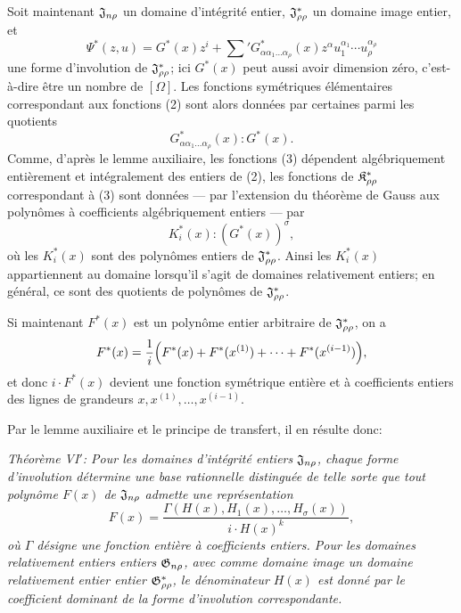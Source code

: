 Soit maintenant $\mathfrak{J}_{n\rho}$ un domaine d’intégrité entier, $\mathfrak{J}^*_{\rho\rho}$ un domaine image entier, et
\[
  \Psi^*(z,u)=G^*(x)z^i+
  \sum{}'G^*_{\alpha\alpha_1\ldots\alpha_\rho}(x)
  z^\alpha u_1^{\alpha_1}\cdots u_\rho^{\alpha_\rho}
\]
une forme d'involution de $\mathfrak{J}^*_{\rho\rho}$; ici $G^*(x)$ peut aussi avoir dimension zéro, c'est-à-dire être un nombre de $[\Omega]$. Les fonctions symétriques élémentaires correspondant aux fonctions (2) sont alors données par certaines parmi les quotients
\begin{equation}
  G^*_{\alpha\alpha_1\ldots\alpha_\rho}(x):G^*(x).
\tag{4}
\end{equation}
Comme, d'après le lemme auxiliaire, les fonctions (3) dépendent algébriquement entièrement et intégralement des entiers de (2), les fonctions de $\mathfrak{K}^*_{\rho\rho}$ correspondant à (3) sont données --- par l'extension du théorème de Gauss aux polynômes à coefficients algébriquement entiers --- par
\begin{equation}
 K_i^*(x):(G^*(x))^\sigma,
\tag{5}
\end{equation}
où les $K_i^*(x)$ sont des polynômes entiers de $\mathfrak{J}^*_{\rho\rho}$. Ainsi les $K_i^*(x)$ appartiennent au domaine lorsqu'il s'agit de domaines relativement entiers; en général, ce sont des quotients de polynômes de $\mathfrak{J}^*_{\rho\rho}$.

Si maintenant $F^*(x)$ est un polynôme entier arbitraire de $\mathfrak{J}^*_{\rho\rho}$, on a
\[
  F^*(x)=\frac1i\Bigl(F^*(x)+F^*(x^{(1)})+\cdots+F^*(x^{(i-1)})\Bigr),
\]
et donc $i\cdot F^*(x)$ devient une fonction symétrique entière et à coefficients entiers des lignes de grandeurs $x,x^{(1)},\ldots,x^{(i-1)}$.

Par le lemme auxiliaire et le principe de transfert, il en résulte donc:

\emph{Théorème VI$'$: Pour les domaines d’intégrité entiers $\mathfrak{J}_{n\rho}$, chaque forme d'involution détermine une base rationnelle distinguée de telle sorte que tout polynôme $F(x)$ de $\mathfrak{J}_{n\rho}$ admette une représentation}
\[
  F(x)=\frac{\Gamma(H(x),H_1(x),\ldots,H_\sigma(x))}{i\cdot H(x)^k},
\]
\emph{où $\Gamma$ désigne une fonction entière à coefficients entiers. Pour les domaines relativement entiers entiers $\mathfrak{G}_{n\rho}$, avec comme domaine image un domaine relativement entier entier $\mathfrak{G}^*_{\rho\rho}$, le dénominateur $H(x)$ est donné par le coefficient dominant de la forme d'involution correspondante.}

